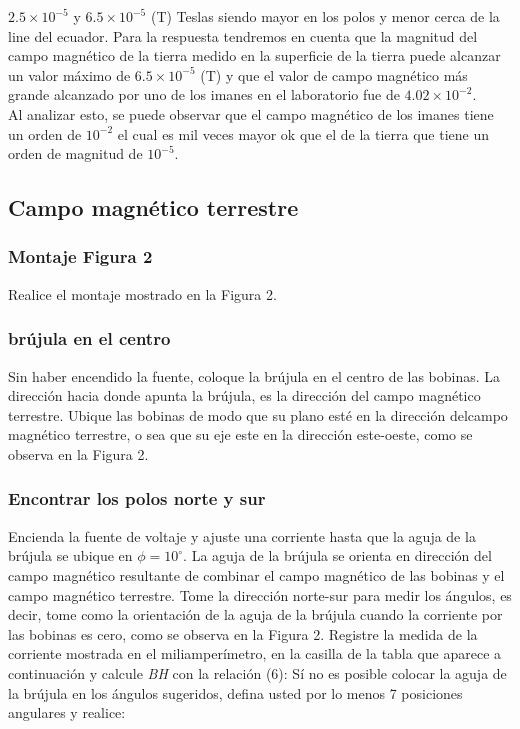 \(2.5\times10^{-5}\) y \(6.5\times10^{-5}\) (T) Teslas siendo mayor en los polos
y menor cerca de la line del ecuador. Para la respuesta tendremos en cuenta que
la magnitud del campo magnético de la tierra medido en la superficie de la
tierra puede alcanzar un valor máximo de \(6.5\times10^{-5}\) (T) y que el
valor de campo magnético más grande alcanzado por uno de los imanes en el
laboratorio fue de \(4.02\times10^{-2}\).\\

Al analizar esto, se puede observar que el campo magnético de los imanes tiene
un orden de \(10^{-2}\) el cual es mil veces mayor ok que el de la tierra
que tiene un orden de magnitud de \(10^{-5}\).


\subsection{Campo magnético terrestre}

\subsubsection{Montaje Figura 2}
Realice el montaje mostrado en la Figura 2.


\subsubsection{brújula en el centro}
Sin haber encendido la fuente, coloque la brújula en el centro de las bobinas.
La dirección hacia donde apunta la brújula, es la dirección del campo magnético
terrestre. Ubique las bobinas de modo que su plano esté en la dirección delcampo
magnético terrestre, o sea que su eje este en la dirección este-oeste, como se
observa en la Figura 2.


\subsubsection{Encontrar los polos norte y sur}
Encienda la fuente de voltaje y ajuste una corriente hasta que la aguja de la
brújula se ubique en \(\phi = 10^\circ\). La aguja de la brújula se orienta en dirección del campo
magnético resultante de combinar el campo magnético de las bobinas y el campo
magnético terrestre. Tome la dirección norte-sur para medir los ángulos, es
decir, tome como la orientación de la aguja de la brújula cuando la corriente
por las bobinas es cero, como se observa en la Figura 2. Registre la medida de
la corriente mostrada en el miliamperímetro, en la casilla de la tabla que
aparece a continuación y calcule \textit{BH} con la relación (6): Sí no es posible colocar
la aguja de la brújula en los ángulos sugeridos, defina usted por lo menos 7
posiciones angulares y realice:


